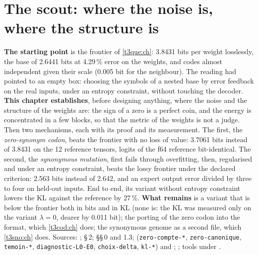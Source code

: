 \chapter{The scout: where the noise is, where the structure is}\label{t3ecl:ch}

\begin{origine}
\textbf{The starting point} is the frontier of \cref{t3que:ch}: 3.8431 bits per weight losslessly, the base of 2.6441 bits at 4.29\,\% error on the weights, and codes almost independent given their scale (0.005 bit for the neighbour). The reading had pointed to an empty box: choosing the symbols of a nested base by error feedback on the real inputs, under an entropy constraint, without touching the decoder.
\textbf{This chapter establishes}, before designing anything, where the noise and the structure of the weights are: the sign of a zero is a perfect coin, and the energy is concentrated in a few blocks, so that the metric of the weights is not a judge. Then two mechanisms, each with its proof and its measurement. The first, the \emph{zero-synonym codon}, beats the frontier with no loss of value: 3.7061 bits instead of 3.8431 on the 12 reference tensors, logits of the f64 reference bit-identical. The second, the \emph{synonymous mutation}, first fails through overfitting, then, regularised and under an entropy constraint, beats the lossy frontier under the declared criterion: 2.563 bits instead of 2.642, and an expert output error divided by three to four on held-out inputs. End to end, its variant without entropy constraint lowers the KL against the reference by 27\,\%.
\textbf{What remains} is a variant that is below the frontier both in bits and in KL (none is: the KL was measured only on the variant $\lambda = 0$, dearer by 0.011 bit); the porting of the zero codon into the format, which \cref{t3cod:ch} does; the synonymous genome as a second file, which \cref{t3sno:ch} does.
Sources: ;  §\,2;  §§\,0 and 1.3;  (\texttt{zero-compte-*}, \texttt{zero-canonique}, \texttt{temoin-*}, \texttt{diagnostic-L0-E0}, \texttt{choix-delta}, \texttt{kl-*}) and ; ; tools under .
\end{origine}

